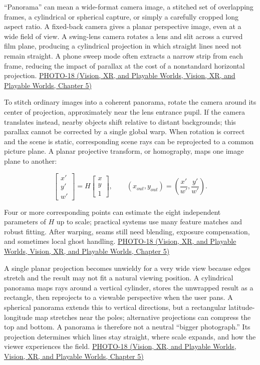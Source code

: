 ``Panorama'' can mean a wide-format camera image, a stitched set of overlapping frames, a cylindrical or spherical capture, or simply a carefully cropped long aspect ratio. A fixed-back camera gives a planar perspective image, even at a wide field of view. A swing-lens camera rotates a lens and slit across a curved film plane, producing a cylindrical projection in which straight lines need not remain straight. A phone sweep mode often extracts a narrow strip from each frame, reducing the impact of parallax at the cost of a nonstandard horizontal projection. \href{../07-Vision-XR-and-Playable-Worlds/main.pdf\#nameddest=04-visual-computing-ii-ch036-photo-18---photography-session-18}{PHOTO-18 (Vision, XR, and Playable Worlds, Vision, XR, and Playable Worlds, Chapter 5)}

To stitch ordinary images into a coherent panorama, rotate the camera around its center of projection, approximately near the lens entrance pupil. If the camera translates instead, nearby objects shift relative to distant backgrounds; this parallax cannot be corrected by a single global warp. When rotation is correct and the scene is static, corresponding scene rays can be reprojected to a common picture plane. A planar projective transform, or homography, maps one image plane to another:

\[
\begin{bmatrix}x'\\y'\\w'\end{bmatrix}
=H\begin{bmatrix}x\\y\\1\end{bmatrix},\qquad
(x_{out},y_{out})=\left(\frac{x'}{w'},\frac{y'}{w'}\right).
\]

Four or more corresponding points can estimate the eight independent parameters of \(H\) up to scale; practical systems use many feature matches and robust fitting. After warping, seams still need blending, exposure compensation, and sometimes local ghost handling. \href{../07-Vision-XR-and-Playable-Worlds/main.pdf\#nameddest=04-visual-computing-ii-ch036-photo-18---photography-session-18}{PHOTO-18 (Vision, XR, and Playable Worlds, Vision, XR, and Playable Worlds, Chapter 5)}

A single planar projection becomes unwieldy for a very wide view because edges stretch and the result may not fit a natural viewing position. A cylindrical panorama maps rays around a vertical cylinder, stores the unwrapped result as a rectangle, then reprojects to a viewable perspective when the user pans. A spherical panorama extends this to vertical directions, but a rectangular latitude-longitude map stretches near the poles; alternative projections can compress the top and bottom. A panorama is therefore not a neutral ``bigger photograph.'' Its projection determines which lines stay straight, where scale expands, and how the viewer experiences the field. \href{../07-Vision-XR-and-Playable-Worlds/main.pdf\#nameddest=04-visual-computing-ii-ch036-photo-18---photography-session-18}{PHOTO-18 (Vision, XR, and Playable Worlds, Vision, XR, and Playable Worlds, Chapter 5)}


